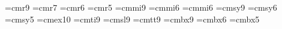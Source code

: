 
\font\ninerm=cmr9
\font\sevenrm=cmr7
\font\sixrm=cmr6
\font\fiverm=cmr5
\font\ninei=cmmi9
\font\sixi=cmmi6
\font\fivei=cmmi6
\font\ninesy=cmsy9
\font\sixsy=cmsy6
\font\fivesy=cmsy5
\font\tenex=cmex10
\font\nineit=cmti9
\font\ninesl=cmsl9
\font\ninett=cmtt9
\font\ninebf=cmbx9
\font\sixbf=cmbx6
\font\fivebf=cmbx5


\def\ninepoint{\def\rm{\fam0\ninerm}%
  \textfont0=\ninerm \scriptfont0=\sixrm \scriptscriptfont0=\fiverm
  \textfont1=\ninei \scriptfont1=\sixi \scriptscriptfont0=\fivei
  \textfont2=\ninesy \scriptfont2=\sixsy \scriptscriptfont2=\fivesy
  \textfont3=\tenex \scriptfont3=\tenex \scriptscriptfont3=\tenex
  \textfont\itfam=\nineit  \def\it{\fam\itfam\nineit}%
  \textfont\slfam=\ninesl  \def\sl{\fam\slfam\ninesl}%
  \textfont\ttfam=\ninett  \def\tt{\fam\ttfam\ninett}%
  \textfont\bffam=\ninebf  \scriptfont\bffam=\sixbf
   \scriptscriptfont\bffam=\fivebf  \def\bf{\fam\bffam\ninebf}%
  \normalbaselineskip=11pt
  \setbox\strutbox=\hbox{\vrule height8pt depth3pt width0pt}%
  \let\sc=\sevenrm  \normalbaselines\rm}



